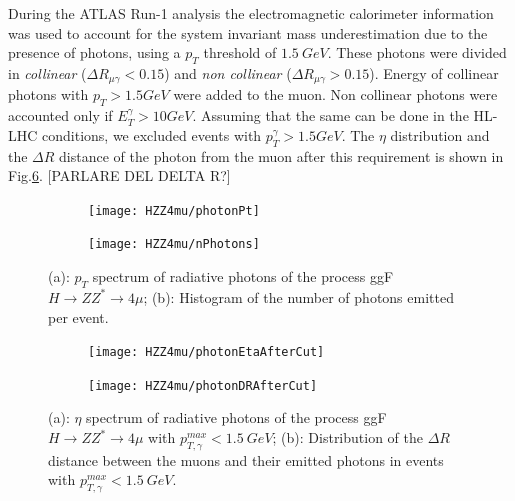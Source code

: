 \documentclass[a4paper,twoside,12pt]{article}
\begin{document}
During the ATLAS Run-1 analysis the electromagnetic calorimeter information was used
to account for the system invariant mass underestimation due to the presence of photons, 
using a $p_T$ threshold of $1.5\ GeV$\cite{HZZ4mu_run1}. These photons were divided
in \textit{collinear} ($\Delta R_{\mu\gamma} < 0.15$) and \textit{non collinear} ($\Delta R_{\mu\gamma} > 0.15$). 
Energy of collinear photons with $p_{T} > 1.5 GeV$ were added to the muon. Non collinear photons 
were accounted only if $E_{T}^{\gamma} > 10 GeV$. Assuming that the same
can be done in the HL-LHC conditions, we excluded events with $p_{T}^{\gamma} > 1.5 GeV$. The $\eta$ distribution
and the $\Delta R$ distance of the photon from the muon after this requirement is shown in Fig.\ref{fig:HZZ4mu:genPhotonsAfterCut}. [PARLARE DEL DELTA R?]\\

\begin{figure}
\centering
\begin{subfigure}{.5\textwidth}
  \centering
  \texttt{[image: HZZ4mu/photonPt]}
  \caption{}
  \label{fig:HZZ4mu:photonPt}
\end{subfigure}%
\begin{subfigure}{.5\textwidth}
  \centering
  \texttt{[image: HZZ4mu/nPhotons]}
  \caption{}
  \label{fig:HZZ4mu:nPhotons}
\end{subfigure}
\caption{(a): $p_T$ spectrum of radiative photons of the process 
	ggF $H \rightarrow ZZ^* \rightarrow 4\mu$; 
	(b): Histogram of the number of photons emitted per event.}
\label{fig:HZZ4mu:genPhotons}
\end{figure}

\begin{figure}
\centering
\begin{subfigure}{.5\textwidth}
  \centering
  \texttt{[image: HZZ4mu/photonEtaAfterCut]}
  \caption{}
  \label{fig:HZZ4mu:photonEtaAfterCut}
\end{subfigure}%
\begin{subfigure}{.5\textwidth}
  \centering
  \texttt{[image: HZZ4mu/photonDRAfterCut]}
  \caption{}
  \label{fig:HZZ4mu:photonDRAfterCut}
\end{subfigure}
\caption{(a): $\eta$ spectrum of radiative photons of the process 
	ggF $H \rightarrow ZZ^* \rightarrow 4\mu$ with $p^{max}_{T, \gamma} < 1.5\ GeV$; 
	(b): Distribution of the $\Delta R$ distance between the muons and their emitted photons in events with $p^{max}_{T, \gamma} < 1.5\ GeV$.}
\label{fig:HZZ4mu:genPhotonsAfterCut}
\end{figure}
\end{document}
